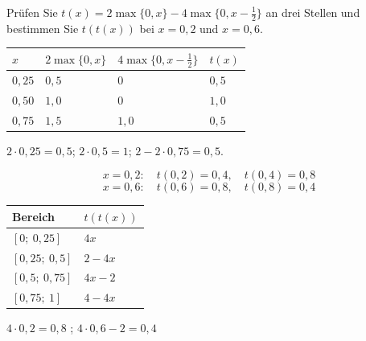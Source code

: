 \begin{aufgabe}
Prüfen Sie $t(x) = 2\max\{0,x\} - 4\max\{0,x-\tfrac12\}$ an drei Stellen und bestimmen Sie $t(t(x))$ bei $x = 0{,}2$ und $x = 0{,}6$.

\loesung
{}
\begin{center}
{\small
\renewcommand{\arraystretch}{1.48}
\begin{tabular}{@{}P{1.4cm}P{2.2cm}P{2.6cm}P{1.8cm}@{}}
\toprule
$x$ & $2\max\{0,x\}$ & $4\max\{0,x-\frac12\}$ & $t(x)$\\
\midrule
$0{,}25$ & $0{,}5$ & $0$ & $0{,}5$\\
$0{,}50$ & $1{,}0$ & $0$ & $1{,}0$\\
$0{,}75$ & $1{,}5$ & $1{,}0$ & $0{,}5$\\
\bottomrule
\end{tabular}}
\end{center}
 $2\cdot0{,}25 = 0{,}5$; $2\cdot0{,}5 = 1$; $2-2\cdot0{,}75 = 0{,}5$. \checkmark

\[ x = 0{,}2: \quad t(0{,}2) = 0{,}4, \quad t(0{,}4) = 0{,}8 \]
\[ x = 0{,}6: \quad t(0{,}6) = 0{,}8, \quad t(0{,}8) = 0{,}4 \]

\begin{center}
{\small
\renewcommand{\arraystretch}{1.48}
\begin{tabular}{@{}P{2.4cm}P{2.6cm}@{}}
\toprule
\textbf{Bereich} & $t(t(x))$\\
\midrule
$[0;\ 0{,}25]$ & $4x$\\
$[0{,}25;\ 0{,}5]$ & $2 - 4x$\\
$[0{,}5;\ 0{,}75]$ & $4x - 2$\\
$[0{,}75;\ 1]$ & $4 - 4x$\\
\bottomrule
\end{tabular}}
\end{center}

 $4\cdot0{,}2 = 0{,}8$ \checkmark; $4\cdot0{,}6-2 = 0{,}4$ \checkmark

\begin{center}
\begin{minipage}{0.88\textwidth}
\end{minipage}
\end{center}
\end{aufgabe}

